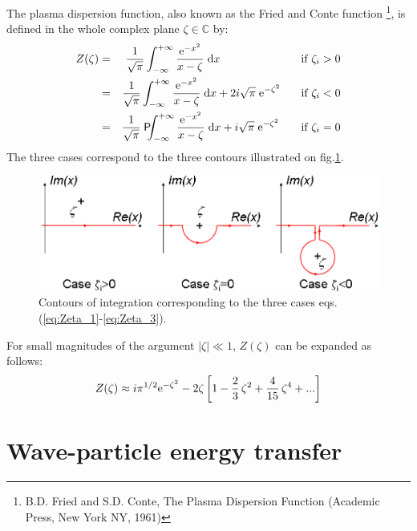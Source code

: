 \documentclass[11pt]{article}
\newcommand{\dd}{\textrm d}
\newcommand{\ee}{\textrm e}
\newcommand{\beq}{\begin{equation}}
\newcommand{\eeq}{\end{equation}}
\begin{document}
The plasma dispersion function, also known as the Fried and Conte function \footnote{B.D. Fried and S.D. Conte, The Plasma Dispersion Function (Academic Press, New York NY, 1961)}, is defined in the whole complex plane $\zeta\in\mathbb{C}$ by:
\begin{eqnarray}
 Z(\zeta) &=& \frac{1}{\sqrt{\pi}}\int_{-\infty}^{+\infty} \frac{\ee^{-x^2}}{x-\zeta}\; \dd x \;\;\;\;\;\;\;\;\;\;\;\;\;\;\;\;\;\;\;\;\;\;\;\;\;\; \textrm{if }\zeta_i>0
 \label{eq:Zeta_1}\\
 &=&\frac{1}{\sqrt{\pi}}\int_{-\infty}^{+\infty} \frac{\ee^{-x^2}}{x-\zeta}\; \dd x + 2i\sqrt{\pi}\; \ee^{-\zeta^2}\;\;\;\;\;\;\, \textrm{if }\zeta_i<0 \label{eq:Zeta_2}\\
 &=&\frac{1}{\sqrt{\pi}}\;\mathsf{P}\!\!\!\int_{-\infty}^{+\infty} \frac{\ee^{-x^2}}{x-\zeta}\; \dd x + i\sqrt{\pi}\; \ee^{-\zeta^2}\;\;\;\;\;\;\; \textrm{if }\zeta_i=0 \label{eq:Zeta_3}
\end{eqnarray}
The three cases correspond to the three contours illustrated on fig.\ref{fig_contourZ}.

\begin{figure}[htbp]
  \begin{center}
  \includegraphics[width=14cm]{Figures/Fig_contourZ.png}
  \end{center}
\caption{Contours of integration corresponding to the three cases eqs.(\ref{eq:Zeta_1}-\ref{eq:Zeta_3}).}
 \label{fig_contourZ}
\end{figure}
For small magnitudes of the argument $|\zeta|\ll1$, $Z(\zeta)$ can be expanded as follows:
\beq
  Z(\zeta) \approx i\pi^{1/2}\ee^{-\zeta^2} -
  2\zeta\left[ 1 - \frac{2}{3}\,\zeta^2 + \frac{4}{15}\,\zeta^4 + ...\right]
\eeq

\section{Wave-particle energy transfer}
\label{Appendix_Wint}
\end{document}
